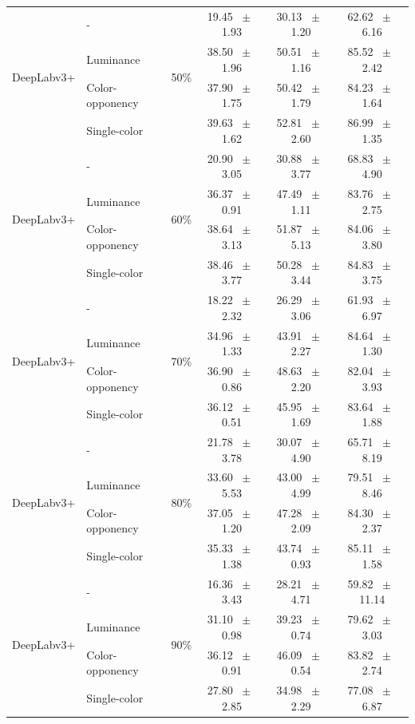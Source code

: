 \begin{table}[h]
\begin{tabular}{@{}l l c c c c@{}}
    \multirow{4}{*}{DeepLabv3+} & - & \multirow{4}{*}{50\%} & 19.45 ~$\pm$~ 1.93 & 30.13 ~$\pm$~ 1.20 & 62.62 ~$\pm$~ 6.16 \\
    & Luminance &  & 38.50 ~$\pm$~ 1.96 & 50.51 ~$\pm$~ 1.16 & 85.52 ~$\pm$~ 2.42 \\
    & Color-opponency &  & 37.90 ~$\pm$~ 1.75 & 50.42 ~$\pm$~ 1.79 & 84.23 ~$\pm$~ 1.64 \\
    & Single-color &  & 39.63 ~$\pm$~ 1.62 & 52.81 ~$\pm$~ 2.60 & 86.99 ~$\pm$~ 1.35 \\
    \midrule
    \multirow{4}{*}{DeepLabv3+} & - & \multirow{4}{*}{60\%} & 20.90 ~$\pm$~ 3.05 & 30.88 ~$\pm$~ 3.77 & 68.83 ~$\pm$~ 4.90 \\
    & Luminance &  & 36.37 ~$\pm$~ 0.91 & 47.49 ~$\pm$~ 1.11 & 83.76 ~$\pm$~ 2.75 \\
    & Color-opponency &  & 38.64 ~$\pm$~ 3.13 & 51.87 ~$\pm$~ 5.13 & 84.06 ~$\pm$~ 3.80 \\
    & Single-color &  & 38.46 ~$\pm$~ 3.77 & 50.28 ~$\pm$~ 3.44 & 84.83 ~$\pm$~ 3.75 \\
    \midrule
    \multirow{4}{*}{DeepLabv3+} & - & \multirow{4}{*}{70\%} & 18.22 ~$\pm$~ 2.32 & 26.29 ~$\pm$~ 3.06 & 61.93 ~$\pm$~ 6.97 \\
    & Luminance &  & 34.96 ~$\pm$~ 1.33 & 43.91 ~$\pm$~ 2.27 & 84.64 ~$\pm$~ 1.30 \\
    & Color-opponency &  & 36.90 ~$\pm$~ 0.86 & 48.63 ~$\pm$~ 2.20 & 82.04 ~$\pm$~ 3.93 \\
    & Single-color &  & 36.12 ~$\pm$~ 0.51 & 45.95 ~$\pm$~ 1.69 & 83.64 ~$\pm$~ 1.88 \\
    \midrule
    \multirow{4}{*}{DeepLabv3+} & - & \multirow{4}{*}{80\%} & 21.78 ~$\pm$~ 3.78 & 30.07 ~$\pm$~ 4.90 & 65.71 ~$\pm$~ 8.19 \\
    & Luminance &  & 33.60 ~$\pm$~ 5.53 & 43.00 ~$\pm$~ 4.99 & 79.51 ~$\pm$~ 8.46 \\
    & Color-opponency &  & 37.05 ~$\pm$~ 1.20 & 47.28 ~$\pm$~ 2.09 & 84.30 ~$\pm$~ 2.37 \\
    & Single-color &  & 35.33 ~$\pm$~ 1.38 & 43.74 ~$\pm$~ 0.93 & 85.11 ~$\pm$~ 1.58 \\
    \midrule
    \multirow{4}{*}{DeepLabv3+} & - & \multirow{4}{*}{90\%} & 16.36 ~$\pm$~ 3.43 & 28.21 ~$\pm$~ 4.71 & 59.82 ~$\pm$~ 11.14 \\
    & Luminance &  & 31.10 ~$\pm$~ 0.98 & 39.23 ~$\pm$~ 0.74 & 79.62 ~$\pm$~ 3.03 \\
    & Color-opponency &  & 36.12 ~$\pm$~ 0.91 & 46.09 ~$\pm$~ 0.54 & 83.82 ~$\pm$~ 2.74 \\
    & Single-color &  & 27.80 ~$\pm$~ 2.85 & 34.98 ~$\pm$~ 2.29 & 77.08 ~$\pm$~ 6.87 \\
    \midrule
    \bottomrule
  \end{tabular}
  \label{tab:deeplabv3plus_acdc_rain}
\end{table}
